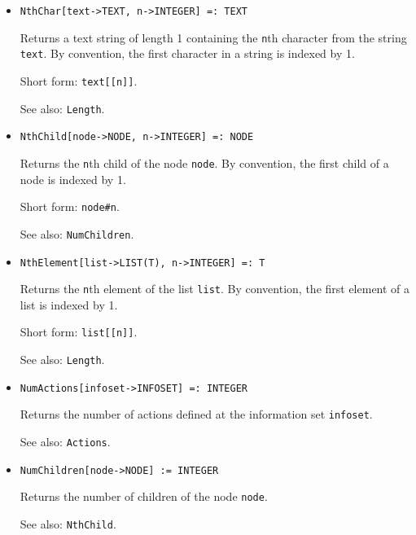 \begin{itemize}
\item
\protect \large \begin{verbatim}
NthChar[text->TEXT, n->INTEGER] =: TEXT
\end{verbatim}\normalsize

\bd
Returns a text string of length 1 containing the \verb+n+th
character from the string \verb+text+.  By convention, the first character
in a string is indexed by 1.
\item
[Short form:] \verb+text[[n]]+.
\item
[See also:] {\tt Length}.
\ed

\item
\protect \large \begin{verbatim} 
NthChild[node->NODE, n->INTEGER] =: NODE
\end{verbatim}\normalsize

\bd
Returns the \verb+n+th child of the node \verb+node+.
By convention, the first child of a node is indexed by 1.
\item
[Short form:] \verb+node#n+.
\item
[See also:] {\tt NumChildren}.
\ed

\item
\protect \large \begin{verbatim}
NthElement[list->LIST(T), n->INTEGER] =: T 
\end{verbatim}\normalsize

\bd
Returns the \verb+n+th element of the list \verb+list+.
By convention, the first element of a list is indexed by 1.
\item
[Short form:] \verb+list[[n]]+.
\item
[See also:] {\tt Length}.
\ed

\item
\protect \large \begin{verbatim}
NumActions[infoset->INFOSET] =: INTEGER
\end{verbatim}\normalsize

\bd
Returns the number of actions defined at the information
set \verb+infoset+.
\item
[See also:] {\tt Actions}.
\ed

\item
\protect \large \begin{verbatim}
NumChildren[node->NODE] := INTEGER
\end{verbatim}\normalsize

\bd
Returns the number of children of the node \verb+node+.
\item
[See also:] {\tt NthChild}.
\ed


\end{itemize}
